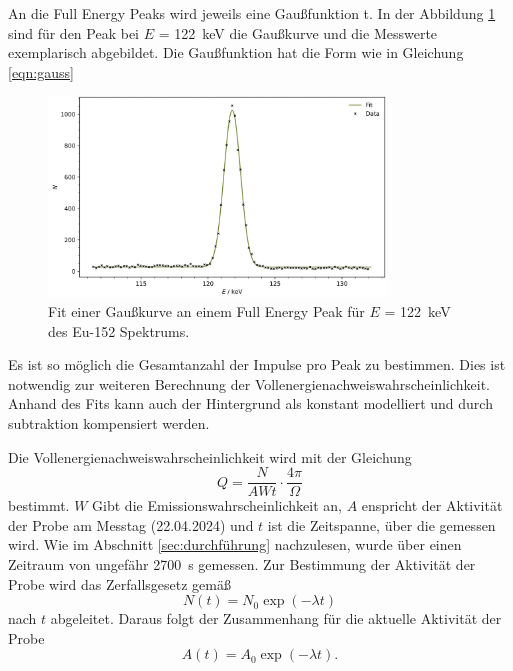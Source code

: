 An die Full Energy Peaks wird jeweils eine Gaußfunktion t. In der Abbildung \ref{fig:plot4} sind für den Peak bei $E$ = \qty{122}{\kilo\eV}
die Gaußkurve und die Messwerte exemplarisch abgebildet. Die Gaußfunktion hat die Form wie in Gleichung \ref{eqn:gauss}

\begin{figure}[H]
    \centering
    \includegraphics[width=0.8\textwidth]{content/plots/plot4.jpg}
   \caption{Fit einer Gaußkurve an einem Full Energy Peak für $E$ = \qty{122}{\kilo\eV} des Eu-152 Spektrums.}
   \label{fig:plot4}
\end{figure}

Es ist so möglich die Gesamtanzahl der Impulse pro Peak zu bestimmen. Dies ist notwendig zur weiteren Berechnung der Vollenergienachweiswahrscheinlichkeit.
Anhand des Fits kann auch der Hintergrund als konstant modelliert und durch subtraktion kompensiert werden.

Die Vollenergienachweiswahrscheinlichkeit wird mit der Gleichung 
\begin{equation*}
    Q = \frac{N}{AWt} \cdot \frac{4\pi}{\Omega}
\end{equation*}
bestimmt. $W$ Gibt die Emissionswahrscheinlichkeit an, $A$ enspricht der Aktivität der Probe am Messtag (22.04.2024) und $t$
ist die Zeitspanne, über die gemessen wird. Wie im Abschnitt \ref{sec:durchführung} nachzulesen, wurde über einen Zeitraum von ungefähr \qty{2700}{\second} gemessen.
Zur Bestimmung der Aktivität der Probe wird das Zerfallsgesetz gemäß
\begin{equation*}
    N(t) = N_0 \exp(-\lambda t)
\end{equation*}
nach $t$ abgeleitet. Daraus folgt der Zusammenhang für die aktuelle Aktivität der Probe
\begin{equation*}
    A(t) = A_0 \exp(-\lambda t).
\end{equation*}

